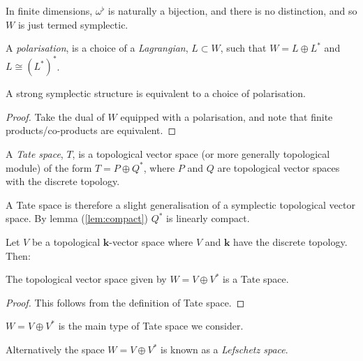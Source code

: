         \begin{rem} In finite dimensions, \( \omega^{\flat}\) is naturally a bijection, and there is no distinction, and so \(W\) is just termed symplectic.
        \end{rem}

        \begin{defn}[Polarisation] \label{defn:polarisation} A  \emph{polarisation}, is a choice of a \emph{Lagrangian}, \(L \subset W\), such that \(W = L \oplus L^*\) and \(L \cong (L^*)^*\).
        \end{defn}
        
        \begin{lem}\label{lem:polarisation}
        A strong symplectic structure is equivalent to a choice of polarisation.
        \end{lem}
        \begin{proof}
        Take the dual of \(W\) equipped with a polarisation, and note that finite products/co-products are equivalent.
        \end{proof}
        
        \begin{defn}
            A \emph{Tate space}, \(T\), is a topological vector space (or more generally topological module) of the form
            \(T= P \oplus Q^*\), where \(P\) and \(Q\) are topological vector spaces with the discrete topology.
        \end{defn}
        
        A Tate space is therefore a slight generalisation of a symplectic topological vector space. By lemma (\ref{lem:compact}) \(Q^*\) is linearly compact. 

        Let \(V\) be a topological \( \mathbf{k}\)-vector space where \(V\) and \( \mathbf{k}\) have the discrete topology. Then:
        
        \begin{lem}
        The topological vector space given by \(W= V \oplus V^*\) is a Tate space.
        \end{lem}
        \begin{proof}
        This follows from the definition of Tate space.
        \end{proof}
        
        \(W= V \oplus V^*\) is the main type of Tate space we consider. 
        
        \begin{rem}
        Alternatively the space  \(W= V \oplus V^*\) is known as a \emph{Lefschetz space}.
        \end{rem}

